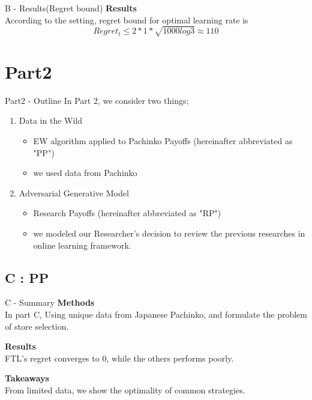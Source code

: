 \documentclass{beamer}
\begin{document}
\begin{frame}{B - Results(Regret bound)}
\textbf{Results}\\
    According to the setting, regret bound for optimal learning rate is
    \[
    Regret_t \leq 2 * 1 * \sqrt{1000log3} \approx 110
    \]
\end{frame}


\section{Part2}


\begin{frame}{Part2 - Outline}
In Part 2, we consider two things;
\begin{enumerate}
    \item Data in the Wild
    \begin{itemize}
        \item EW algorithm applied to Pachinko Payoffs (hereinafter abbreviated as "PP")
        \item we used data from Pachinko
    \end{itemize}
    \item Adversarial Generative Model
    \begin{itemize}
        \item Research Payoffs (hereinafter abbreviated as "RP")
        \item we modeled our Researcher's decision to review the previous researches in online learning framework.
    \end{itemize}
\end{enumerate}
\end{frame}

\subsection{C : PP}

\begin{frame}{C - Summary}
\textbf{Methods}\\
In part C, Using unique data from Japanese Pachinko, and formulate the problem of store selection.  

\vspace{1em}
\textbf{Results}\\
FTL's regret converges to 0, while the others performs poorly.

\vspace{1em}
\textbf{Takeaways}\\
From limited data, we show the optimality of common strategies.
\end{frame}
\end{document}
